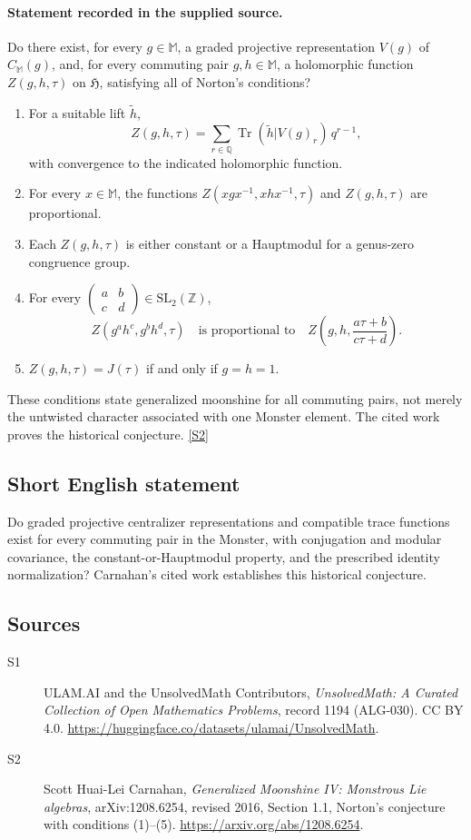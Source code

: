 \documentclass[11pt]{article}
\newcommand{\sref}[2]{\hyperlink{source:#1:#2}{[S#2]}}
\begin{document}
\paragraph{Statement recorded in the supplied source.}
Do there exist, for every \(g\in\mathbb M\), a graded projective
representation \(V(g)\) of \(C_{\mathbb M}(g)\), and, for every commuting
pair \(g,h\in\mathbb M\), a holomorphic function \(Z(g,h,\tau)\) on
\(\mathfrak H\), satisfying all of Norton's conditions?
\begin{enumerate}
\item For a suitable lift \(\widetilde h\),
\[
 Z(g,h,\tau)=\sum_{r\in\mathbb Q}
       \operatorname{Tr}(\widetilde h|V(g)_r)\,q^{r-1},
\]
with convergence to the indicated holomorphic function.
\item For every \(x\in\mathbb M\), the functions
\(Z(xgx^{-1},xhx^{-1},\tau)\) and \(Z(g,h,\tau)\) are proportional.
\item Each \(Z(g,h,\tau)\) is either constant or a Hauptmodul for a
genus-zero congruence group.
\item For every
\(\begin{pmatrix}a&b\\c&d\end{pmatrix}\in\mathrm{SL}_2(\mathbb Z)\),
\[
 Z(g^ah^c,g^bh^d,\tau)
   \quad\text{is proportional to}\quad
 Z\!\left(g,h,\frac{a\tau+b}{c\tau+d}\right).
\]
\item \(Z(g,h,\tau)=J(\tau)\) if and only if \(g=h=1\).
\end{enumerate}
These conditions state generalized moonshine for all commuting pairs,
not merely the untwisted character associated with one Monster element.
The cited work proves the historical conjecture. \sref{1194}{2}
\subsection{Short English statement}
Do graded projective centralizer representations and compatible trace functions exist for every commuting pair in the Monster, with conjugation and modular covariance, the constant-or-Hauptmodul property, and the prescribed identity normalization? Carnahan's cited work establishes this historical conjecture.
\subsection{Sources}
\begin{description}
\item[\hypertarget{source:1194:1}{S1}] ULAM.AI and the UnsolvedMath Contributors, \emph{UnsolvedMath: A Curated Collection of Open Mathematics Problems}, record 1194 (ALG-030). CC BY 4.0. \url{https://huggingface.co/datasets/ulamai/UnsolvedMath}.
\item[\hypertarget{source:1194:2}{S2}] Scott Huai-Lei Carnahan, \emph{Generalized Moonshine IV: Monstrous Lie algebras}, arXiv:1208.6254, revised 2016, Section 1.1, Norton's conjecture with conditions (1)--(5). \url{https://arxiv.org/abs/1208.6254}.
\end{description}
\label{end:1194}
\end{document}
